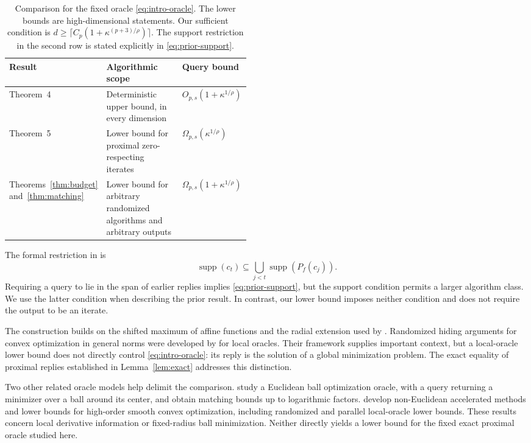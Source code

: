 \documentclass[11pt]{article}
\theoremstyle{definition}
\theoremstyle{remark}
\DeclareMathOperator{\supp}{supp}
\begin{document}
\begin{table}[t]
\centering
\small
\setlength{\tabcolsep}{5pt}
\renewcommand{\arraystretch}{1.18}
\begin{tabularx}{\linewidth}{@{}p{0.22\linewidth}Yp{0.24\linewidth}@{}}
\toprule
Result & Algorithmic scope & Query bound\\
\midrule
\citet{ABJS}\newline Theorem~4
& Deterministic upper bound, in every dimension
& $O_{p,s}(1+\kappa^{1/\rho})$\\
\citet{ABJS}\newline Theorem~5
& Lower bound for proximal zero-respecting iterates
& $\Omega_{p,s}(\kappa^{1/\rho})$\\
Theorems~\ref{thm:budget} and~\ref{thm:matching}
& Lower bound for arbitrary randomized algorithms and arbitrary outputs
& $\Omega_{p,s}(1+\kappa^{1/\rho})$\\
\bottomrule
\end{tabularx}
\caption{Comparison for the fixed oracle \eqref{eq:intro-oracle}.
The lower bounds are high-dimensional statements. Our sufficient condition
is $d\ge\lceil C_p(1+\kappa^{(p+3)/\rho})\rceil$.
The support restriction in the second row is stated explicitly in
\eqref{eq:prior-support}.}
\label{tab:comparison}
\end{table}

The formal restriction in \citet[Definition~22]{ABJS} is
\begin{equation}\label{eq:prior-support}
\supp(c_t)\subseteq\bigcup_{j<t}\supp(P_f(c_j)).
\end{equation}
Requiring a query to lie in the span of earlier replies implies
\eqref{eq:prior-support}, but the support condition permits a larger
algorithm class. We use the latter condition when describing the prior
result. In contrast, our lower bound imposes neither condition and
does not require the output to be an iterate.

The construction builds on the shifted maximum of affine functions and
the radial extension used by \citet[Definition~24 and Eq.~(4)]{ABJS}.
Randomized hiding arguments for convex optimization in general norms
were developed by \citet{DG} for local oracles. Their framework supplies
important context, but a local-oracle lower bound does not directly
control \eqref{eq:intro-oracle}: its reply is the solution of a global
minimization problem. The exact equality of proximal replies established
in Lemma~\ref{lem:exact} addresses this distinction.

Two other related oracle models help delimit the comparison.
\citet{CJJJLST} study a Euclidean ball optimization oracle, with a query
returning a minimizer over a ball around its center, and obtain matching
bounds up to logarithmic factors.
\citet{CGMR} develop non-Euclidean accelerated methods and lower bounds
for high-order smooth convex optimization, including randomized and
parallel local-oracle lower bounds. These results concern local derivative
information or fixed-radius ball minimization. Neither directly yields a
lower bound for the fixed exact proximal oracle studied here.
\end{document}
